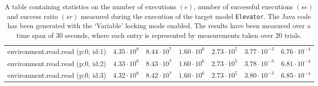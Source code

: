 \begin{table}[htbp]
{\begin{tabular}{lrrrrrr}
\hspace{3mm}environment.read.read (p:0, id:1) & $4.35 \cdot 10^{8}$ & $8.44 \cdot 10^{7}$ & $1.60 \cdot 10^{6}$ & $2.73 \cdot 10^{5}$ & $3.77 \cdot 10^{-3}$ & $6.76 \cdot 10^{-4}$ \\
\hspace{3mm}environment.read.read (p:0, id:2) & $4.33 \cdot 10^{8}$ & $8.43 \cdot 10^{7}$ & $1.60 \cdot 10^{6}$ & $2.73 \cdot 10^{5}$ & $3.78 \cdot 10^{-3}$ & $6.81 \cdot 10^{-4}$ \\
\hspace{3mm}environment.read.read (p:0, id:3) & $4.32 \cdot 10^{8}$ & $8.42 \cdot 10^{7}$ & $1.60 \cdot 10^{6}$ & $2.73 \cdot 10^{5}$ & $3.80 \cdot 10^{-3}$ & $6.85 \cdot 10^{-4}$ \\
\bottomrule
\end{tabular}
}
\caption{A table containing statistics on the number of executions $(e)$, number of successful executions $(se)$ and success ratio $(sr)$ measured during the execution of the target model \texttt{Elevator}. The Java code has been generated with the `Variable' locking mode enabled. The results have been measured over a time span of 30 seconds, where each entry is represented by measurements taken over 20 trials.}
\label{table:frequency_results_elevator_variable}
\end{table}